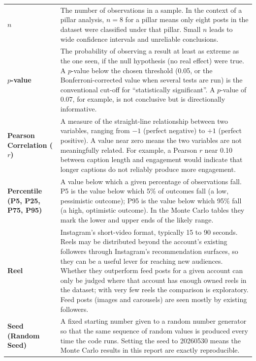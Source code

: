 \begin{longtable}{@{}L{4cm} L{11.5cm}@{}}
\textbf{$n$} &
The number of observations in a sample. In the context of a pillar analysis,
$n = 8$ for a pillar means only eight posts in the dataset were classified under
that pillar. Small $n$ leads to wide confidence intervals and unreliable
conclusions. \\[4pt]

\textbf{$p$-value} &
The probability of observing a result at least as extreme as the one seen, if the
null hypothesis (no real effect) were true. A $p$-value below the chosen threshold
(0.05, or the Bonferroni-corrected value when several tests are run) is the
conventional cut-off for ``statistically significant''. A $p$-value of 0.07, for
example, is not conclusive but is directionally informative. \\[4pt]

\textbf{Pearson Correlation ($r$)} &
A measure of the straight-line relationship between two variables, ranging from
$-1$ (perfect negative) to $+1$ (perfect positive). A value near zero means the
two variables are not meaningfully related. For example, a Pearson $r$ near 0.10
between caption length and engagement would indicate that longer captions do not
reliably produce more engagement. \\[4pt]

\textbf{Percentile (P5, P25, P75, P95)} &
A value below which a given percentage of observations fall. P5 is the value below
which 5\% of outcomes fall (a low, pessimistic outcome); P95 is the value below
which 95\% fall (a high, optimistic outcome). In the Monte Carlo tables they mark
the lower and upper ends of the likely range. \\[4pt]

\textbf{Reel} &
Instagram's short-video format, typically 15 to 90 seconds. Reels may be
distributed beyond the account's existing followers through Instagram's
recommendation surfaces, so they can be a useful lever for reaching new audiences.
Whether they outperform feed posts for a given account can only be judged where
that account has enough owned reels in the dataset; with very few reels the
comparison is exploratory. Feed posts (images and carousels) are seen mostly by
existing followers. \\[4pt]

\textbf{Seed (Random Seed)} &
A fixed starting number given to a random number generator so that the same
sequence of random values is produced every time the code runs. Setting the seed
to 20260530 means the Monte Carlo results in this report are exactly reproducible. \\[4pt]


\end{longtable}
